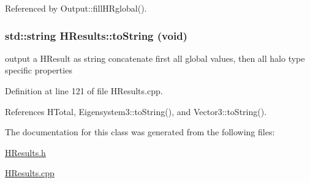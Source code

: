 Referenced by Output::fillHRglobal().

\subsubsection[{toString}]{\setlength{\rightskip}{0pt plus 5cm}std::string HResults::toString (void)}\label{classHResults_af4b87d0a35443db45747a606b0a2549f}


output a HResult as string concatenate first all global values, then all halo type specific properties 



Definition at line 121 of file HResults.cpp.



References HTotal, Eigensystem3::toString(), and Vector3::toString().



The documentation for this class was generated from the following files:\begin{DoxyCompactItemize}
\item 
\hyperlink{HResults_8h}{HResults.h}\item 
\hyperlink{HResults_8cpp}{HResults.cpp}\end{DoxyCompactItemize}
